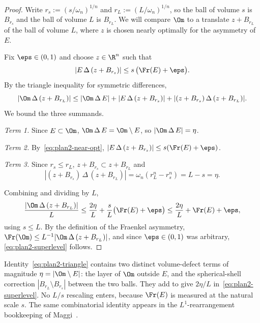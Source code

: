 \begin{proof}
Write $r_s:=(s/\omega_n)^{1/n}$ and $r_L:=(L/\omega_n)^{1/n}$, so the
ball of volume $s$ is $B_{r_s}$ and the ball of volume $L$ is
$B_{r_L}$. We will compare $\Om$ to a translate $z+B_{r_L}$ of the
ball of volume $L$, where $z$ is chosen nearly optimally for the
asymmetry of $E$.

Fix $\eps\in(0,1)$ and choose $z\in\R^n$ such that
\begin{equation}\label{eq:plan2-near-opt}
   |E\,\Delta\,(z+B_{r_s})|\le s\,\bigl(\Fr(E)+\eps\bigr).
\end{equation}
By the triangle inequality for symmetric differences,
\begin{equation}\label{eq:plan2-triangle}
   |\Om\,\Delta\,(z+B_{r_L})|
   \le |\Om\,\Delta\,E|
      +|E\,\Delta\,(z+B_{r_s})|
      +|(z+B_{r_s})\,\Delta\,(z+B_{r_L})|.
\end{equation}
We bound the three summands.

\emph{Term 1.} Since $E\subset\Om$, $\Om\,\Delta\,E=\Om\setminus E$, so
$|\Om\,\Delta\,E|=\eta$.

\emph{Term 2.} By~\eqref{eq:plan2-near-opt},
$|E\,\Delta\,(z+B_{r_s})|\le s(\Fr(E)+\eps)$.

\emph{Term 3.} Since $r_s\le r_L$, $z+B_{r_s}\subset z+B_{r_L}$ and
\[
   |(z+B_{r_s})\,\Delta\,(z+B_{r_L})|
   =\omega_n(r_L^n-r_s^n)=L-s=\eta.
\]

Combining and dividing by $L$,
\begin{equation}\label{eq:plan2-combine}
   \frac{|\Om\,\Delta\,(z+B_{r_L})|}{L}
   \le \frac{2\eta}{L}+\frac{s}{L}\bigl(\Fr(E)+\eps\bigr)
   \le \frac{2\eta}{L}+\Fr(E)+\eps,
\end{equation}
using $s\le L$. By the definition of the Fraenkel asymmetry,
$\Fr(\Om)\le L^{-1}|\Om\,\Delta\,(z+B_{r_L})|$, and since
$\eps\in(0,1)$ was arbitrary, \eqref{eq:plan2-superlevel} follows.
\end{proof}

\begin{remark}
\label{rem:plan2-two-summands}
Identity~\eqref{eq:plan2-triangle} contains two distinct
volume-defect terms of magnitude $\eta=|\Om\setminus E|$: the layer of
$\Om$ outside $E$, and the spherical-shell correction
$|B_{r_L}\setminus B_{r_s}|$ between the two balls. They add to give
$2\eta/L$ in~\eqref{eq:plan2-superlevel}. No $L/s$ rescaling enters,
because $\Fr(E)$ is measured at the natural scale $s$. The same
combinatorial identity appears in the $L^1$-rearrangement bookkeeping
of Maggi~\cite{Maggi2012}.
\end{remark}

